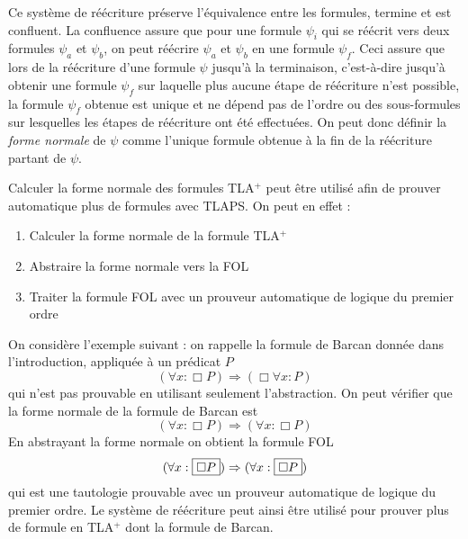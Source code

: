 \documentclass[12pt]{article}
\begin{document}
Ce système de réécriture préserve l'équivalence entre les formules, termine et est confluent.
La confluence assure que pour une formule \(\psi_i\) qui se réécrit vers deux formules \(\psi_a\) et \(\psi_b\), on peut réécrire \(\psi_a\) et \(\psi_b\) en une formule \(\psi_f\).
Ceci assure que lors de la réécriture d'une formule \(\psi\) jusqu'à la terminaison, c'est-à-dire jusqu'à obtenir une formule \(\psi_f\) sur laquelle plus aucune étape de réécriture n'est possible, la formule \(\psi_f\) obtenue est unique et ne dépend pas de l'ordre ou des sous-formules sur lesquelles les étapes de réécriture ont été effectuées.
On peut donc définir la \emph{forme normale} de \(\psi\) comme l'unique formule obtenue à la fin de la réécriture partant de \(\psi\).

Calculer la forme normale des formules TLA$^+$ peut être utilisé afin de prouver automatique plus de formules avec TLAPS.
On peut en effet :
\begin{enumerate}
\item Calculer la forme normale de la formule TLA$^+$
\item Abstraire la forme normale vers la FOL
\item Traiter la formule FOL avec un prouveur automatique de logique du premier ordre
\end{enumerate}

On considère l'exemple suivant :
on rappelle la formule de Barcan donnée dans l'introduction, appliquée à un prédicat \(P\)
\[(\forall x : \Box P) \Rightarrow (\Box \forall x : P)\]
qui n'est pas prouvable en utilisant seulement l'abstraction.
On peut vérifier que la forme normale de la formule de Barcan est
\[(\forall x : \Box P) \Rightarrow (\forall x : \Box P)\]
En abstrayant la forme normale on obtient la formule FOL
\[(\forall x : \fbox{\(\Box P\)}) \Rightarrow (\forall x : \fbox{\(\Box P\)})\]
qui est une tautologie prouvable avec un prouveur automatique de logique du premier ordre.
Le système de réécriture peut ainsi être utilisé pour prouver plus de formule en TLA$^+$ dont la formule de Barcan.
\end{document}
